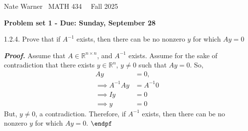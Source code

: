 \documentclass{report}
\title{\Huge{}}
\author{\huge{Nathan Warner}}
\date{\huge{}}
\begin{document}
    \pagebreak \bigbreak \noindent
    Nate Warner \ \quad \quad \quad \quad \quad \quad \quad \quad \quad \quad \quad \quad  MATH 434 \quad  \quad \quad \quad \quad \quad \quad \quad \quad \ \ \quad \quad Fall 2025
    \begin{center}
        \textbf{Problem set 1 - Due: Sunday, September 28}
    \end{center}
    \bigbreak \noindent 
    \begin{mdframed}
        1.2.4. Prove that if $A^{-1}$ exists, then there can be no nonzero $y$ for which $Ay = 0$
    \end{mdframed}
    \bigbreak \noindent 
    \textbf{\textit{Proof.}} Assume that $A \in \mathbb{R}^{n\times n}$, and $A^{-1}$ exists. Assume for the sake of contradiction that there exists $y \in \mathbb{R}^{n}$, $y\ne 0$ such that $Ay=  0$. So,
    \begin{align*}
        Ay &= 0, \\
        \implies A^{-1}Ay &= A^{-1}0 \\
        \implies Iy &= 0 \\
        \implies y &= 0
    \end{align*}
    But, $y\ne 0$, a contradiction. Therefore, if $A^{-1}$ exists, then there can be no nonzero $y$ for which $Ay = 0$. $\endpf $
\end{document}
